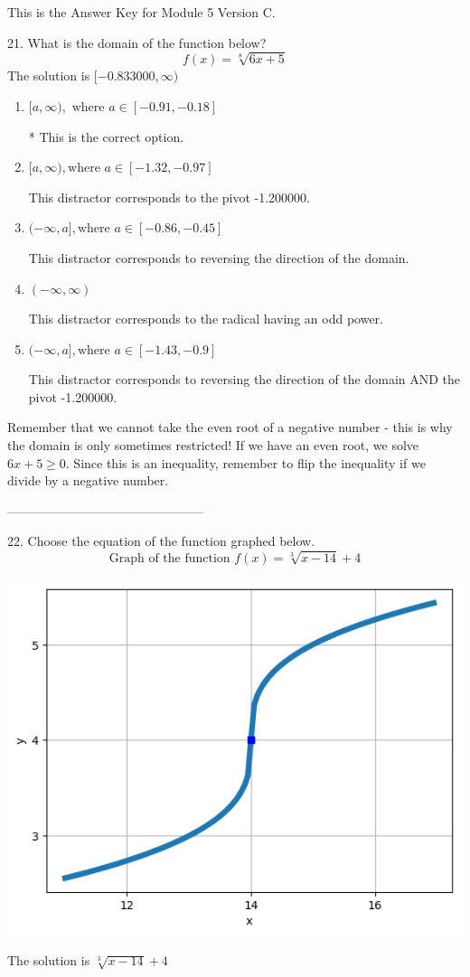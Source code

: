 \documentclass{article}[10pt]
\begin{document}
This is the Answer Key for Module 5 Version C.

21. What is the domain of the function below?
$$ f(x) = \sqrt[8]{6 x + 5} $$ 
The solution is $ [-0.833000, \infty) $ 

\begin{enumerate}[label=\Alph*.] 
\item $ [a, \infty), \text{ where } a \in [-0.91, -0.18] $ 

 * This is the correct option. 
\item $ [a, \infty), \text{where } a \in [-1.32, -0.97] $ 

 This distractor corresponds to the pivot -1.200000. 
\item $ (-\infty, a], \text{where } a \in [-0.86, -0.45] $ 

 This distractor corresponds to reversing the direction of the domain. 
\item $ (-\infty, \infty) $ 

 This distractor corresponds to the radical having an odd power. 
\item $ (-\infty, a], \text{where } a \in [-1.43, -0.9] $ 

 This distractor corresponds to reversing the direction of the domain AND the pivot -1.200000. 
\end{enumerate} 
 
Remember that we cannot take the even root of a negative number - this is why the domain is only sometimes restricted! If we have an even root, we solve $6 x + 5 \geq 0$. Since this is an inequality, remember to flip the inequality if we divide by a negative number.

-----------------------------------------------

22. Choose the equation of the function graphed below.
$$ \text{Graph of the function } f(x) = \sqrt[3]{x - 14} + 4 $$ 
\begin{center}\includegraphics[scale=0.5]{../Figures/question22C.png}\end{center}The solution is $ \sqrt[3]{x - 14} + 4 $ 
\end{document}
